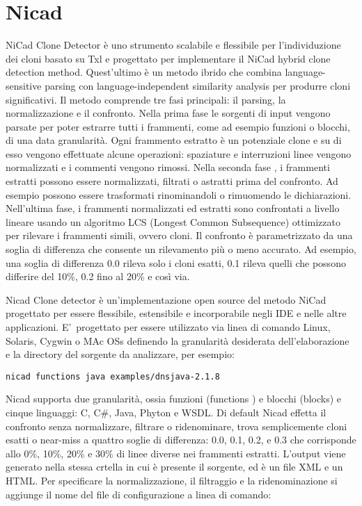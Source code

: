 \section{Nicad}
NiCad Clone Detector è uno strumento scalabile e flessibile per l'individuzione dei cloni basato su Txl e progettato per implementare il NiCad hybrid clone detection method. Quest'ultimo è un metodo ibrido che combina language-sensitive parsing con language-independent similarity analysis per produrre cloni significativi.
Il metodo comprende tre fasi principali: il parsing, la normalizzazione e il confronto.
Nella prima fase le sorgenti di input vengono parsate per poter estrarre tutti i frammenti, come ad esempio funzioni o blocchi, di una data granularità. Ogni frammento estratto è un potenziale clone e su di esso vengono effettuate alcune operazioni: spaziature e interruzioni linee vengono normalizzati e i commenti vengono rimossi. 
Nella seconda fase , i frammenti estratti possono essere normalizzati, filtrati o astratti prima del confronto. Ad esempio possono essere trasformati rinominandoli o rimuomendo le dichiarazioni.
Nell'ultima fase, i frammenti normalizzati ed estratti sono confrontati a livello lineare usando un algoritmo LCS (Longest Common Subsequence) ottimizzato per rilevare i frammenti simili, ovvero cloni. Il confronto è parametrizzato da una soglia di differenza che consente un rilevamento più o meno accurato. Ad esempio, una soglia di differenza 0.0 rileva solo i cloni esatti, 0.1 rileva quelli che possono differire del 10\%, 0.2 fino al 20\% e così via.

Nicad Clone detector è un'implementazione open source del metodo NiCad progettato per essere flessibile, estensibile e incorporabile negli IDE e nelle altre applicazioni. E'\ progettato per essere utilizzato via linea di comando Linux, Solaris, Cygwin o MAc OSs definendo la granularità desiderata dell'elaborazione e la directory del sorgente da analizzare, per esempio: 

\begin{center}
\verb|nicad functions java examples/dnsjava-2.1.8|
\end{center}

Nicad supporta due granularità, ossia funzioni (functions ) e blocchi (blocks) e cinque linguaggi: C, C\#, Java, Phyton e WSDL.
Di default Nicad effetta il confronto senza normalizzare, filtrare o ridenominare, trova semplicemente cloni esatti o near-miss a quattro soglie di differenza: 0.0, 0.1, 0.2, e 0.3 che corrisponde allo 0\%, 10\%, 20\% e 30\% di linee diverse nei frammenti estratti.
L'output viene generato nella stessa crtella in cui è presente il sorgente, ed è un file XML e un HTML.
Per specificare la normalizzazione, il filtraggio e la ridenominazione si aggiunge il nome del file di configurazione a linea di comando:

